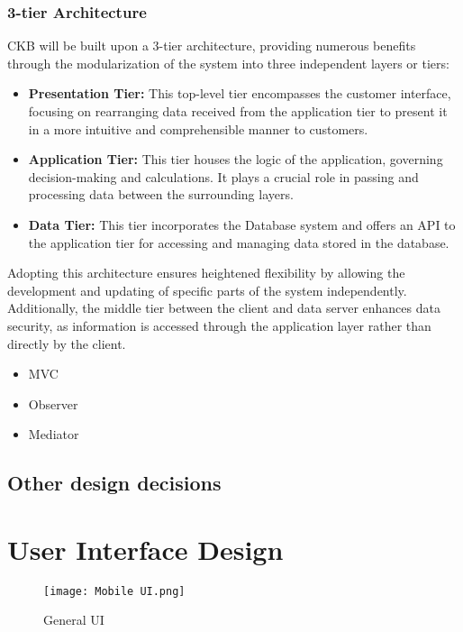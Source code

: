 \documentclass{article}
\begin{document}
\subsubsection{3-tier Architecture}
CKB will be built upon a 3-tier architecture, providing numerous benefits through the modularization of the system into three independent layers or tiers:
\begin{itemize}
    \item \textbf{Presentation Tier:} This top-level tier encompasses the customer interface, focusing on rearranging data received from the application tier to present it in a more intuitive and comprehensible manner to customers.
    \item \textbf{Application Tier:} This tier houses the logic of the application, governing decision-making and calculations. It plays a crucial role in passing and processing data between the surrounding layers.
    \item \textbf{Data Tier:} This tier incorporates the Database system and offers an API to the application tier for accessing and managing data stored in the database.
\end{itemize}
Adopting this architecture ensures heightened flexibility by allowing the development and updating of specific parts of the system independently. Additionally, the middle tier between the client and data server enhances data security, as information is accessed through the application layer rather than directly by the client.

\begin{itemize}
    \item MVC
    \item Observer
    \item Mediator
\end{itemize}

\subsection{Other design decisions}


\section{User Interface Design}


\begin{figure}[H]
    \centering
    \texttt{[image: Mobile UI.png]}
    \caption{General UI}
\end{figure}
\end{document}
